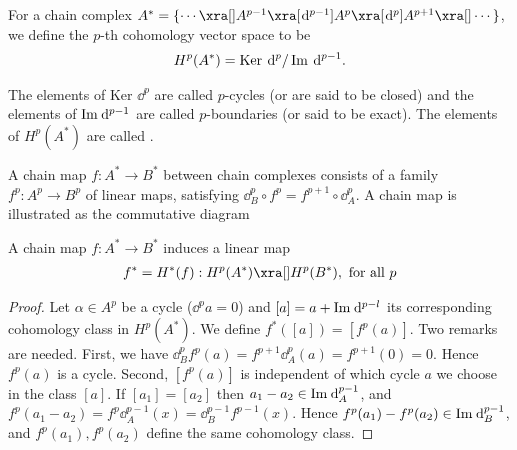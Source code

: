 \begin{definition}\label{def:4-2}
  For a chain complex $A^* = \{\cdots\xra[] A^{p-1}\xra[\dd^{p-1}] A^p\xra[\dd^p] A^{p+1}\xra[]\cdots\}$, we define
  the $p$-th cohomology vector space to be
  \begin{align*}
    H^p(A^*) = \ker\dd^p/\im\dd^{p-1}.
  \end{align*}

  The elements of Ker $\dd^p$ are called $p$-cycles (or are said to be closed) and the
  elements of $\im\dd^{p-1}$ are called $p$-boundaries (or said to be exact). The elements
  of $H^p(A^*)$ are called .

  A chain map $f:A^*\to B^*$ between chain complexes consists of a family $f^p: A^p\to B^p$ of linear maps, satisfying
  $\dd_B^p\circ f^p = f^{p+1}\circ\dd^p_A$. A chain map is illustrated as the commutative diagram


  \begin{center}
  \end{center}
\end{definition}

\begin{lemma}\label{lemma:4-3}
  A chain map $f:A^*\to B^*$ induces a linear map
  \begin{align*}
    f^* = H^*(f): H^p(A^*)\xra[] H^p(B^*), \text{ for all } p
  \end{align*}
\end{lemma}

\begin{proof}
  Let $\alpha\in A^p$ be a cycle ($\dd^pa = 0$) and $[a] = a + \im\dd^{p-l}$ its corresponding
  cohomology class in $H^p(A^*)$. We define $f^*([a]) = [f^p(a)]$. Two remarks are
  needed. First, we have $\dd^p_B f^p(a) = f^{p+1}\dd^p_A(a) = f^{p+1}(0) = 0$. Hence $f^p(a)$ is
  a cycle. Second, $[f^p(a)]$ is independent of which cycle $a$ we choose in the class
  $[a]$. If $[a_1] = [a_2]$ then $a_1-a_2\in\im\dd^{p-1}_A$, and $f^p(a_1-a_2) = f^p\dd^{p-1}_A(x)
    = \dd^{p-1}_Bf^{p-1}(x)$. Hence $f^p(a_1) - f^p(a_2) \in\im\dd^{p-1}_B$, and $f^p(a_1), f^p(a_2)$ define the
  same cohomology class.
\end{proof}

